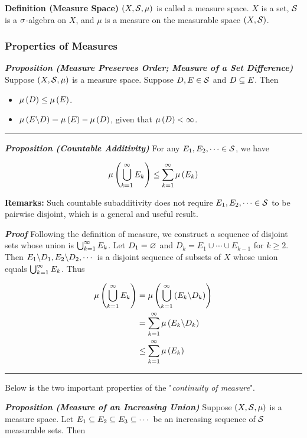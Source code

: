 \documentclass[
]{article}
\begin{document}
\textbf{Definition (Measure Space)} \(\pr{X,\S,\mu}\) is called a
measure space. \(X\) is a set, \(\S\) is a \(\s\)-algebra on \(X\), and
\(\mu\) is a measure on the measurable space \(\pr{X,\S}\).

\hypertarget{properties-of-measures}{%
\subsubsection{Properties of Measures}\label{properties-of-measures}}

\emph{\textbf{Proposition (Measure Preserves Order; Measure of a Set
Difference)}} Suppose \(\pr{X,\S,\mu}\) is a measure space. Suppose
\(D,E\in \S\) and \(D\se E\). Then

\begin{itemize}
\item
  \(\mu\pr D\le \mu \pr E\).
\item
  \(\mu\pr{E\c D} = \mu\pr E-\mu\pr D\), given that
  \(\mu\pr{D}<\infty\).
\end{itemize}

\begin{center}\rule{0.5\linewidth}{0.5pt}\end{center}

\emph{\textbf{Proposition (Countable Additivity)}} For any
\(E_1,E_2,\cdots\in \S\), we have

\[\mu\pr{\uinf E_k}\le \sinf \mu\pr{E_k}\]

\textbf{Remarks:} Such countable subadditivity does not require
\(E_1,E_2,\cdots\in \S\) to be pairwise disjoint, which is a general and
useful result.

\emph{\textbf{Proof}} Following the definition of measure, we construct
a sequence of disjoint sets whose union is \(\uinf E_k\). Let
\(D_1 = \empty\) and \(D_k = E_1\cup \cdots \cup E_{k-1}\) for
\(k\ge 2\). Then \(E_1\c D_1,E_2\c D_2,\cdots\) is a disjoint sequence
of subsets of \(X\) whose union equals \(\uinf E_k\). Thus

\[\ba
\lm{\uinf E_k} & = \lm{\uinf\pr{E_k\c D_k}}\\
& = \sinf \lm{E_k\c D_k}\\
& \le \sinf\lm{E_k}
\ea\]

\begin{center}\rule{0.5\linewidth}{0.5pt}\end{center}

Below is the two important properties of the "\emph{continuity of
measure}".

\emph{\textbf{Proposition (Measure of an Increasing Union)}} Suppose
\(\pr{X,\S,\mu}\) is a measure space. Let
\(E_1\se E_2\se E_3\se \cdots\) be an increasing sequence of \(\S\)
measurable sets. Then
\end{document}
